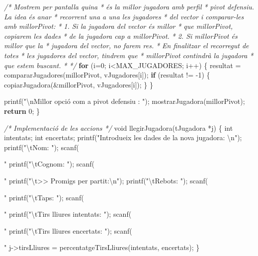 \documentclass[]{book}
\newenvironment{Shaded}{\begin{snugshade}}{\end{snugshade}}
\newcommand{\DataTypeTok}[1]{\textcolor[rgb]{0.13,0.29,0.53}{#1}}
\newcommand{\DecValTok}[1]{\textcolor[rgb]{0.00,0.00,0.81}{#1}}
\newcommand{\SpecialCharTok}[1]{\textcolor[rgb]{0.00,0.00,0.00}{#1}}
\newcommand{\StringTok}[1]{\textcolor[rgb]{0.31,0.60,0.02}{#1}}
\newcommand{\CommentTok}[1]{\textcolor[rgb]{0.56,0.35,0.01}{\textit{#1}}}
\newcommand{\ControlFlowTok}[1]{\textcolor[rgb]{0.13,0.29,0.53}{\textbf{#1}}}
\newcommand{\NormalTok}[1]{#1}
\begin{document}
\begin{Shaded}
\begin{Highlighting}[]
    \CommentTok{/* Mostrem per pantalla quina}
\CommentTok{     * és la millor jugadora amb perfil}
\CommentTok{     * pivot defensiu. La idea és anar}
\CommentTok{     * recorrent una a una les jugadores}
\CommentTok{     * del vector i comparar-les amb millorPivot:}
\CommentTok{     * 1. Si la jugadora del vector és millor}
\CommentTok{     *    que millorPivot, copiarem les dades}
\CommentTok{     *    de la jugadora cap a millorPivot.}
\CommentTok{     * 2. Si millorPivot és millor que la}
\CommentTok{     *    jugadora del vector, no farem res.}
\CommentTok{     * En finalitzar el recorregut de totes}
\CommentTok{     * les jugadores del vector, tindrem que}
\CommentTok{     * millorPivot contindrà la jugadora}
\CommentTok{     * que estem buscant.}
\CommentTok{     * */}
    \ControlFlowTok{for}\NormalTok{ (i=}\DecValTok{0}\NormalTok{; i<MAX_JUGADORES; i++) \{}
\NormalTok{        resultat = compararJugadores(millorPivot, vJugadores[i]);}
        \ControlFlowTok{if}\NormalTok{ (resultat != -}\DecValTok{1}\NormalTok{) \{}
\NormalTok{            copiarJugadora(&millorPivot, vJugadores[i]);}
\NormalTok{        \}}
\NormalTok{    \}}
    
\NormalTok{    printf(}\StringTok{"}\SpecialCharTok{\textbackslash{}n}\StringTok{Millor opció com a pivot defensiu : "}\NormalTok{);}
\NormalTok{    mostrarJugadora(millorPivot);}
    \ControlFlowTok{return} \DecValTok{0}\NormalTok{;}
\NormalTok{\}}

\CommentTok{/* Implementació de les accions */}
\DataTypeTok{void}\NormalTok{ llegirJugadora(tJugadora *j) \{}
    \DataTypeTok{int}\NormalTok{ intentats;}
    \DataTypeTok{int}\NormalTok{ encertats;}
\NormalTok{    printf(}\StringTok{"Introdueix les dades de la nova jugadora: }\SpecialCharTok{\textbackslash{}n}\StringTok{"}\NormalTok{);}
\NormalTok{    printf(}\StringTok{"}\SpecialCharTok{\textbackslash{}t}\StringTok{Nom: "}\NormalTok{);}
\NormalTok{    scanf(}\StringTok{"%
\NormalTok{    printf(}\StringTok{"}\SpecialCharTok{\textbackslash{}t}\StringTok{Cognom: "}\NormalTok{);}
\NormalTok{    scanf(}\StringTok{"%
\NormalTok{    printf(}\StringTok{"}\SpecialCharTok{\textbackslash{}t}\StringTok{>> Promigs per partit:}\SpecialCharTok{\textbackslash{}n}\StringTok{"}\NormalTok{);}
\NormalTok{    printf(}\StringTok{"}\SpecialCharTok{\textbackslash{}t}\StringTok{Rebots: "}\NormalTok{);}
\NormalTok{    scanf(}\StringTok{"%
\NormalTok{    printf(}\StringTok{"}\SpecialCharTok{\textbackslash{}t}\StringTok{Taps: "}\NormalTok{);}
\NormalTok{    scanf(}\StringTok{"%
\NormalTok{    printf(}\StringTok{"}\SpecialCharTok{\textbackslash{}t}\StringTok{Tirs lliures intentats: "}\NormalTok{);}
\NormalTok{    scanf(}\StringTok{"%
\NormalTok{    printf(}\StringTok{"}\SpecialCharTok{\textbackslash{}t}\StringTok{Tirs lliures encertats: "}\NormalTok{);}
\NormalTok{    scanf(}\StringTok{"%
\NormalTok{    j->tirsLliures = percentatgeTirsLliures(intentats, encertats);}
\NormalTok{\}}

}}}}}}
\end{Highlighting}
\end{Shaded}
\end{document}
